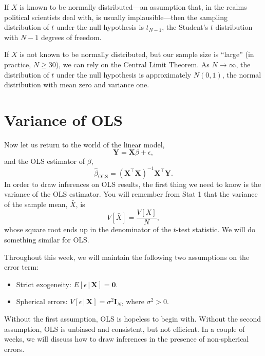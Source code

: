 \documentclass[12pt,oneside,openany]{book}
\begin{document}
If \(X\) is known to be normally distributed---an assumption that, in
the realms political scientists deal with, is usually implausible---then
the sampling distribution of \(t\) under the null hypothesis is
\(t_{N - 1}\), the Student's \(t\) distribution with \(N - 1\) degrees
of freedom.

If \(X\) is not known to be normally distributed, but our sample size is
``large'' (in practice, \(N \geq 30\)), we can rely on the Central Limit
Theorem. As \(N \to \infty\), the distribution of \(t\) under the null
hypothesis is approximately \(N(0, 1)\), the normal distribution with
mean zero and variance one.

\section{Variance of OLS}\label{variance-of-ols}

Now let us return to the world of the linear model, \[
\mathbf{Y} = \mathbf{X} \beta + \epsilon,
\] and the OLS estimator of \(\beta\), \[
\hat{\beta}_{\text{OLS}} = (\mathbf{X}^\top \mathbf{X})^{-1} \mathbf{X}^\top \mathbf{Y}.
\] In order to draw inferences on OLS results, the first thing we need
to know is the variance of the OLS estimator. You will remember from
Stat 1 that the variance of the sample mean, \(\bar{X}\), is \[
V[\bar{X}] = \frac{V[X]}{N},
\] whose square root ends up in the denominator of the \(t\)-test
statistic. We will do something similar for OLS.

Throughout this week, we will maintain the following two assumptions on
the error term:

\begin{itemize}
\item
  Strict exogeneity: \(E[\epsilon \,|\, \mathbf{X}] = \mathbf{0}\).
\item
  Spherical errors:
  \(V[\epsilon \,|\, \mathbf{X}] = \sigma^2 \mathbf{I}_N\), where
  \(\sigma^2 > 0\).
\end{itemize}

Without the first assumption, OLS is hopeless to begin with. Without the
second assumption, OLS is unbiased and consistent, but not efficient. In
a couple of weeks, we will discuss how to draw inferences in the
presence of non-spherical errors.
\end{document}

